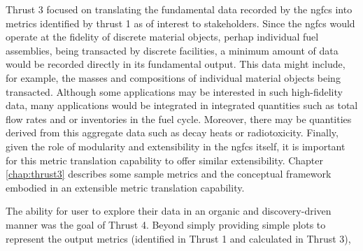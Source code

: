 Thrust 3 focused on translating the fundamental data recorded by the
\gls{ngfcs} into metrics identified by thrust 1 as of interest to
stakeholders.  Since the \gls{ngfcs} would operate at the fidelity of discrete
material objects, perhap individual fuel assemblies, being transacted by
discrete facilities, a minimum amount of data would be recorded directly in
its fundamental output.  This data might include, for example, the masses and
compositions of individual material objects being transacted.  Although some
applications may be interested in such high-fidelity data, many applications
would be integrated in integrated quantities such as total flow rates and or
inventories in the fuel cycle.  Moreover, there may be quantities derived from
this aggregate data such as decay heats or radiotoxicity.  Finally, given the
role of modularity and extensibility in the \gls{ngfcs} itself, it is
important for this metric translation capability to offer similar
extensibility.  Chapter \ref{chap:thrust3} describes some sample metrics and
the conceptual framework embodied in an extensible metric translation
capability.

The ability for user to explore their data in an organic and discovery-driven
manner was the goal of Thrust 4.  Beyond simply providing simple plots to
represent the output metrics (identified in Thrust 1 and calculated in Thrust
3), 

